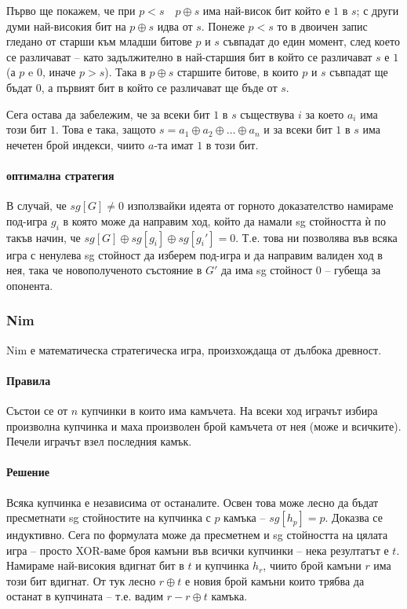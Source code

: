 \documentclass[a4paper]{article}
\begin{document}
    Първо ще покажем, че при $p < s \quad p \oplus s$ има най-висок бит който
    е $1$ в $s$; с други думи най-високия бит на $p \oplus s$ идва от $s$.
    Понеже $p < s$ то в двоичен запис гледано от старши към младши битове $p$
    и $s$ съвпадат до един момент, след което се различават -- като
    задължително в най-старшия бит в който се различават $s$ е $1$ (а $p$
    e $0$, иначе $p > s$). Така в $p \oplus s$ старшите битове, в които $p$
    и $s$ съвпадат ще бъдат $0$, а първият бит в който се различават ще бъде от
    $s$.

    Сега остава да забележим, че за всеки бит $1$ в $s$ съществува $i$ за което
    $a_i$ има този бит $1$. Това е така, защото $s = a_1 \oplus a_2 \oplus
    \dots \oplus a_n$ и за всеки бит $1$ в $s$ има нечетен брой индекси, чиито
    $a$-та имат $1$ в този бит.

    \paragraph{оптимална стратегия}
    В случай, че $sg[G] \ne 0$ използвайки идеята от горното доказателство
    намираме под-игра $g_i$ в която може да направим ход, който да намали sg
    стойността ѝ по такъв начин, че $sg[G] \oplus sg[g_i] \oplus sg[g_i'] = 0$.
    Т.е. това ни позволява във всяка игра с ненулева sg стойност да изберем
    под-игра и да направим валиден ход в нея, така че новополученото състояние
    в $G'$ да има sg стойност $0$ -- губеща за опонента.

    \subsubsection{Nim}
    Nim е математическа стратегическа игра, произхождаща от дълбока древност.
    \paragraph{Правила}
    Състои се от $n$ купчинки в които има камъчета. На всеки ход играчът избира
    произволна купчинка и маха произволен брой камъчета от нея (може
    и всичките). Печели играчът взел последния камък.
    
    \paragraph{Решение}
    Всяка купчинка е независима от останалите. Освен това може лесно да бъдат
    пресметнати sg стойностите на купчинка с $p$ камъка -- $sg[h_p] = p$.
    Доказва се индуктивно. Сега по формулата може да пресметнем и sg стойността
    на цялата игра -- просто XOR-ваме броя камъни във всички купчинки -- нека
    резултатът е $t$. Намираме най-високия вдигнат бит в $t$ и купчинка $h_r$,
    чиито брой камъни $r$ има този бит вдигнат. От тук лесно $r \oplus t$
    е новия брой камъни които трябва да останат в купчината -- т.е. вадим $r
    - r \oplus t$ камъка.
\end{document}
